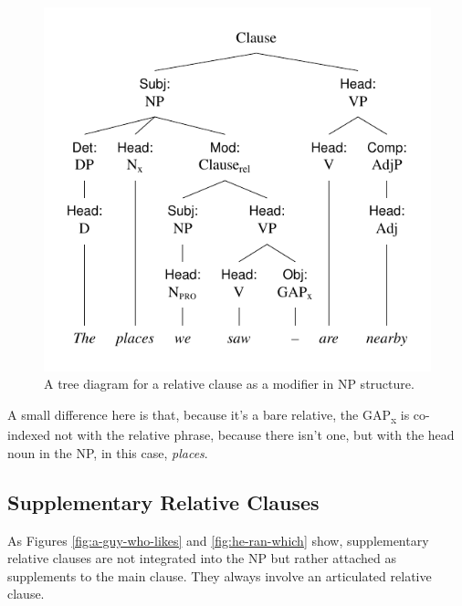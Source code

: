\begin{figure}[ht]
    \centering
    \includegraphics{figures/the-places-we-saw.pdf}
    \caption{A tree diagram for a relative clause as a modifier in NP structure.}
    \label{fig:the-places-we-saw}
\end{figure}

A small difference here is that, because it's a bare relative, the GAP\textsubscript{x} is co-indexed not with the relative phrase, because there isn't one, but with the head noun in the NP, in this case, \textit{places}.

\subsection{Supplementary Relative Clauses}

As Figures \ref{fig:a-guy-who-likes} and \ref{fig:he-ran-which} show, supplementary relative clauses are not integrated into the NP but rather attached as supplements to the main clause. They always involve an articulated relative clause.

